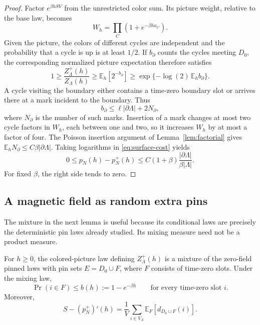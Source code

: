 \begin{proof}
Factor $e^{\beta hSV}$ from the unrestricted color sum. Its picture
weight, relative to the base law, becomes
\[
 W_h=\prod_C(1+e^{-\beta h a_C}).
\]
Given the picture, the colors of different cycles are independent and
the probability that a cycle is up is at least $1/2$. If $b_\partial$
counts the cycles meeting $D_0$, the corresponding normalized picture
expectation therefore satisfies
\begin{equation}
 1\ge \frac{Z^+_\Lambda(h)}{Z_\Lambda(h)}
 \ge \mathbb E_h[2^{-b_\partial}]
 \ge \exp\{-\log(2)\,\mathbb E_h b_\partial\}.
 \label{eq:surface-cost}
\end{equation}
A cycle visiting the boundary either contains a time-zero boundary
slot or arrives there at a mark incident to the boundary. Thus
\[
 b_\partial\le \ell|\partial\Lambda|+2N_\partial,
\]
where $N_\partial$ is the number of such marks. Insertion of a mark
changes at most two cycle factors in $W_h$, each between one and two,
so it increases $W_h$ by at most a factor of four. The Poisson insertion
argument of Lemma~\ref{lem:factorial} gives
$\mathbb E_hN_\partial\le C\beta|\partial\Lambda|$.
Taking logarithms in \eqref{eq:surface-cost} yields
\[
 0\le p_N(h)-p_N^+(h)
 \le C(1+\beta)\frac{|\partial\Lambda|}{\beta|\Lambda|}.
\]
For fixed $\beta$, the right side tends to zero.
\end{proof}

\subsection{A magnetic field as random extra pins}

The mixture in the next lemma is useful because its conditional laws
are precisely the deterministic pin laws already studied. Its mixing
measure need not be a product measure.

\begin{lemma}
\label{lem:pin-mixture}
For $h\ge0$, the colored-picture law defining $Z^+_\Lambda(h)$ is
a mixture of the zero-field pinned laws with pin sets $E=D_0\cup F$,
where $F$ consists of time-zero slots. Under the mixing law,
\begin{equation}
 \Pr(i\in F)\le b(h):=1-e^{-\beta h}
 \qquad\text{for every time-zero slot }i.
 \label{eq:pin-marginal}
\end{equation}
Moreover,
\begin{equation}
 S-(p_N^+)'(h)
   =\frac1V\sum_{i\in V_\Lambda}\mathbb E_F[d_{D_0\cup F}(i)].
 \label{eq:field-deficit}
\end{equation}
\end{lemma}

